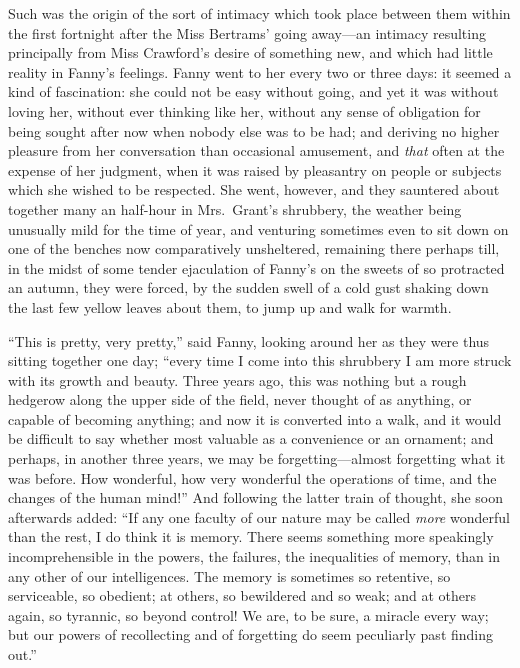 Such was the origin of the sort of intimacy which took
place between them within the first fortnight after
the Miss Bertrams' going away---an intimacy resulting
principally from Miss Crawford's desire of something new,
and which had little reality in Fanny's feelings.
Fanny went to her every two or three days:  it seemed a kind
of fascination:  she could not be easy without going,
and yet it was without loving her, without ever thinking
like her, without any sense of obligation for being
sought after now when nobody else was to be had;
and deriving no higher pleasure from her conversation
than occasional amusement, and \emph{that} often at the expense
of her judgment, when it was raised by pleasantry on
people or subjects which she wished to be respected.
She went, however, and they sauntered about together
many an half-hour in Mrs.\ Grant's shrubbery, the weather
being unusually mild for the time of year, and venturing
sometimes even to sit down on one of the benches now
comparatively unsheltered, remaining there perhaps till,
in the midst of some tender ejaculation of Fanny's on
the sweets of so protracted an autumn, they were forced,
by the sudden swell of a cold gust shaking down the last few
yellow leaves about them, to jump up and walk for warmth.

``This is pretty, very pretty,'' said Fanny, looking around
her as they were thus sitting together one day; ``every time
I come into this shrubbery I am more struck with its
growth and beauty.  Three years ago, this was nothing
but a rough hedgerow along the upper side of the field,
never thought of as anything, or capable of becoming anything;
and now it is converted into a walk, and it would be
difficult to say whether most valuable as a convenience
or an ornament; and perhaps, in another three years,
we may be forgetting---almost forgetting what it was before.
How wonderful, how very wonderful the operations of time,
and the changes of the human mind!''  And following
the latter train of thought, she soon afterwards added:
``If any one faculty of our nature may be called \emph{more}
wonderful than the rest, I do think it is memory.
There seems something more speakingly incomprehensible
in the powers, the failures, the inequalities
of memory, than in any other of our intelligences.
The memory is sometimes so retentive, so serviceable,
so obedient; at others, so bewildered and so weak;
and at others again, so tyrannic, so beyond control!
We are, to be sure, a miracle every way; but our powers
of recollecting and of forgetting do seem peculiarly past
finding out.''

